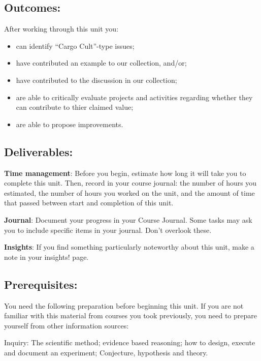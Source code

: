 \documentclass[]{book}
\providecommand{\tightlist}{%
  \setlength{\itemsep}{0pt}\setlength{\parskip}{0pt}}
\begin{document}
\subsection{Outcomes:}\label{outcomes-5}

After working through this unit you:

\begin{itemize}
\tightlist
\item
  can identify ``Cargo Cult''-type issues;
\item
  have contributed an example to our collection, and/or;
\item
  have contributed to the discussion in our collection;
\item
  are able to critically evaluate projects and activities regarding
  whether they can contribute to thier claimed value;
\item
  are able to propose improvements.
\end{itemize}

\subsection{Deliverables:}\label{deliverables-5}

\textbf{Time management}: Before you begin, estimate how long it will
take you to complete this unit. Then, record in your course journal: the
number of hours you estimated, the number of hours you worked on the
unit, and the amount of time that passed between start and completion of
this unit.

\textbf{Journal}: Document your progress in your Course Journal. Some
tasks may ask you to include specific items in your journal. Don't
overlook these.

\textbf{Insights}: If you find something particularly noteworthy about
this unit, make a note in your insights! page.

\subsection{Prerequisites:}\label{prerequisites-2}

You need the following preparation before beginning this unit. If you
are not familiar with this material from courses you took previously,
you need to prepare yourself from other information sources:

Inquiry: The scientific method; evidence based reasoning; how to design,
execute and document an experiment; Conjecture, hypothesis and theory.
\end{document}
